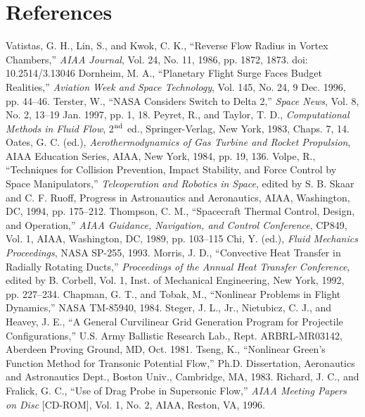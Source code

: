 \documentclass[letterpaper]{AIAA}
\begin{document}
\section*{References}

\begin{thebibliography}{}
 Vatistas, G. H., Lin, S., and Kwok, C. K., ``Reverse Flow Radius in Vortex Chambers,'' \textit{AIAA Journal}, Vol. 24, No. 11, 1986, pp. 1872, 1873. doi: 10.2514/3.13046
 Dornheim, M. A., ``Planetary Flight Surge Faces Budget Realities,'' \textit{Aviation Week and Space Technology}, Vol. 145, No. 24, 9 Dec. 1996, pp. 44--46.
 Terster, W., ``NASA Considers Switch to Delta 2,'' \textit{Space News}, Vol. 8, No. 2, 13--19 Jan. 1997, pp. 1, 18.
 Peyret, R., and Taylor, T. D., \textit{Computational Methods in Fluid Flow}, 2$^{{\rm nd}}$ ed., Springer-Verlag, New York, 1983, Chaps. 7, 14.
 Oates, G. C. (ed.), \textit{Aerothermodynamics of Gas Turbine and Rocket Propulsion}, AIAA Education Series, AIAA, New York, 1984, pp. 19, 136.
 Volpe, R., ``Techniques for Collision Prevention, Impact Stability, and Force Control by Space Manipulators,'' \textit{Teleoperation and Robotics in Space}, edited by S. B. Skaar and C. F. Ruoff, Progress in Astronautics and Aeronautics, AIAA, Washington, DC, 1994, pp. 175--212.
 Thompson, C. M., ``Spacecraft Thermal Control, Design, and Operation,'' \textit{AIAA Guidance, Navigation, and Control Conference}, CP849, Vol. 1, AIAA, Washington, DC, 1989, pp. 103--115
 Chi, Y. (ed.), \textit{Fluid Mechanics Proceedings}, NASA SP-255, 1993.
 Morris, J. D., ``Convective Heat Transfer in Radially Rotating Ducts,'' \textit{Proceedings of the Annual Heat Transfer Conference}, edited by B. Corbell, Vol. 1, Inst. of Mechanical Engineering, New York, 1992, pp. 227--234.
 Chapman, G. T., and Tobak, M., ``Nonlinear Problems in Flight Dynamics,'' NASA TM-85940, 1984.
 Steger, J. L., Jr., Nietubicz, C. J., and Heavey, J. E., ``A General Curvilinear Grid Generation Program for Projectile Configurations,'' U.S. Army Ballistic Research Lab., Rept. ARBRL-MR03142, Aberdeen Proving Ground, MD, Oct. 1981.
 Tseng, K., ``Nonlinear Green's Function Method for Transonic Potential Flow,'' Ph.D. Dissertation, Aeronautics and Astronautics Dept., Boston Univ., Cambridge, MA, 1983.
 Richard, J. C., and Fralick, G. C., ``Use of Drag Probe in Supersonic Flow,'' \textit{AIAA Meeting Papers on Disc} [CD-ROM], Vol. 1, No. 2, AIAA, Reston, VA, 1996.

\end{thebibliography}
\end{document}
